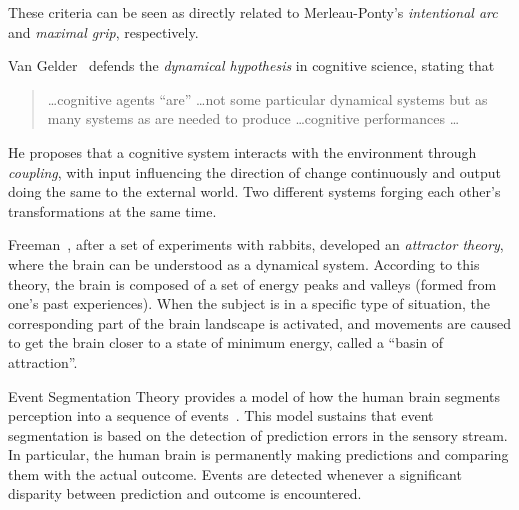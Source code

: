 \documentclass{article}
\begin{document}
These criteria can be seen as directly related to Merleau-Ponty's
\emph{intentional arc} and \emph{maximal grip}, respectively.


Van Gelder~\cite{vangelder1998} defends the \emph{dynamical hypothesis} in
cognitive science, stating that

\begin{quotation}
  \dots cognitive agents ``are'' \dots not some particular dynamical systems but
  as many systems as are needed to produce \dots cognitive performances \dots
\end{quotation}

He proposes that a cognitive system interacts with the environment through
\emph{coupling}, with input influencing the direction of change continuously and
output doing the same to the external world. Two different systems forging each
other's transformations at the same time.

Freeman~\cite{freeman1991}, after a set of experiments with rabbits, developed
an \emph{attractor theory}, where the brain can be understood as a dynamical 
system. According to this theory, the brain is composed of a set of energy peaks
and valleys (formed from one's past experiences). When the subject is in a
specific type of situation, the corresponding part of the brain landscape is
activated, and movements are caused to get the brain closer to a state of
minimum energy, called a ``basin of attraction''.


Event Segmentation Theory provides a model of how the human brain segments
perception into a sequence of events~\cite{kurby07,zacks07}. This model sustains
that event segmentation is based on the detection of prediction errors in the
sensory stream. In particular, the human brain is permanently making predictions
and comparing them with the actual outcome. Events are detected whenever a
significant disparity between prediction and outcome is encountered.
\end{document}

